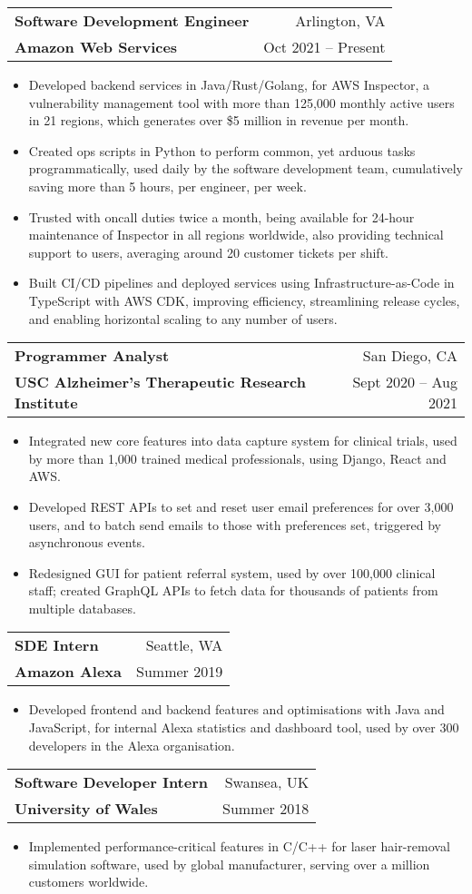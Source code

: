 \documentclass[letterpaper,11pt]{article}
\makeatletter
\newcommand{\resumeSubheading}[4]{
  \vspace{-1pt}\item
    \begin{tabular*}{0.98\textwidth}[t]{l@{\extracolsep{\fill}}r}
      \textbf{#1} & #2 \\
      {\small#3} & {\small #4} \\
    \end{tabular*}\vspace{-5pt}
}
\newcommand{\resumeItemListStart}{\begin{itemize}[leftmargin=*]}
\newcommand{\resumeItemListEnd}{\end{itemize}\vspace{-5pt}}
\makeatother
\begin{document}
\resumeSubheading
  {Software Development Engineer}{Arlington, VA}
  {\textbf{Amazon Web Services}}{Oct 2021 -- Present}
    \resumeItemListStart
      \item {Developed backend services in Java/Rust/Golang, for AWS Inspector, a vulnerability management tool with more than
125,000 monthly active users in 21 regions, which generates over \$5 million in revenue per month.}
      \item {Created ops scripts in Python to perform common, yet arduous tasks programmatically, used daily by the software development team, cumulatively saving more than 5 hours, per engineer, per week.}
      \item {Trusted with oncall duties twice a month, being available for 24-hour maintenance of Inspector in all regions
worldwide, also providing technical support to users, averaging around 20 customer tickets per shift.}
      \item {Built CI/CD pipelines and deployed services using Infrastructure-as-Code in TypeScript with AWS CDK, improving efficiency, streamlining release cycles, and enabling horizontal scaling to any number of users.}
    \resumeItemListEnd

\resumeSubheading
  {Programmer Analyst}{San Diego, CA}
  {\textbf{USC Alzheimer’s Therapeutic Research Institute}}{Sept 2020 -- Aug 2021}
    \resumeItemListStart
      \item {Integrated new core features into data capture system for clinical trials, used by more than 1,000 trained medical professionals, using Django, React and AWS.}
      \item {Developed REST APIs to set and reset user email preferences for over 3,000 users, and to batch send emails
to those with preferences set, triggered by asynchronous events.}
      \item {Redesigned GUI for patient referral system, used by over 100,000 clinical staff; created GraphQL APIs to
fetch data for thousands of patients from multiple databases.}
    \resumeItemListEnd

\resumeSubheading
  {SDE Intern}{Seattle, WA}
  {\textbf{Amazon Alexa}}{Summer 2019}
    \resumeItemListStart
      \item {Developed frontend and backend features and optimisations with Java and JavaScript, for internal Alexa statistics and dashboard tool, used by over 300 developers in the Alexa organisation.}
    \resumeItemListEnd

\resumeSubheading
  {Software Developer Intern}{Swansea, UK}
  {\textbf{University of Wales}}{Summer 2018}
    \resumeItemListStart
      \item {Implemented performance-critical features in C/C++ for laser hair-removal simulation software, used by global manufacturer, serving over a million customers worldwide.}
    \resumeItemListEnd
\end{document}
